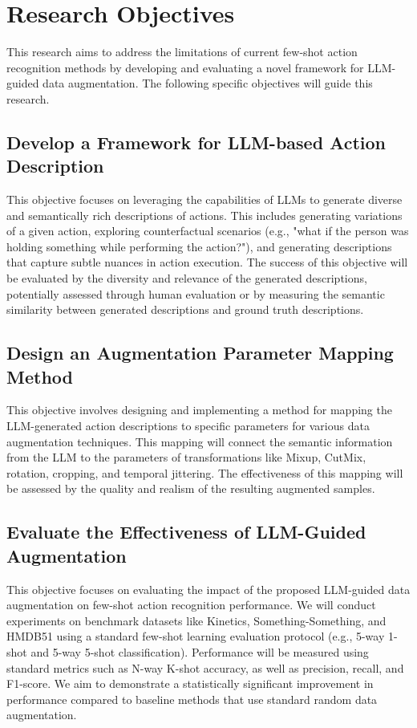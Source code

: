 \section{Research Objectives}

This research aims to address the limitations of current few-shot action recognition methods by developing and evaluating a novel framework for LLM-guided data augmentation. The following specific objectives will guide this research.


\subsection{Develop a Framework for LLM-based Action Description } %

This objective focuses on leveraging the capabilities of LLMs to generate diverse and semantically rich descriptions of actions. This includes generating variations of a given action, exploring counterfactual scenarios (e.g., "what if the person was holding something while performing the action?"), and generating descriptions that capture subtle nuances in action execution. The success of this objective will be evaluated by the diversity and relevance of the generated descriptions, potentially assessed through human evaluation or by measuring the semantic similarity between generated descriptions and ground truth descriptions.

\subsection{Design an Augmentation Parameter Mapping Method} 
This objective involves designing and implementing a method for mapping the LLM-generated action descriptions to specific parameters for various data augmentation techniques. This mapping will connect the semantic information from the LLM to the parameters of transformations like Mixup, CutMix, rotation, cropping, and temporal jittering. The effectiveness of this mapping will be assessed by the quality and realism of the resulting augmented samples.

\subsection{Evaluate the Effectiveness of LLM-Guided Augmentation} 

This objective focuses on evaluating the impact of the proposed LLM-guided data augmentation on few-shot action recognition performance. We will conduct experiments on benchmark datasets like Kinetics, Something-Something\cite{goyal2017something}, and HMDB51 \cite{kuehne2011hmdb} using a standard few-shot learning evaluation protocol (e.g., 5-way 1-shot and 5-way 5-shot classification). Performance will be measured using standard metrics such as N-way K-shot accuracy, as well as precision, recall, and F1-score. We aim to demonstrate a statistically significant improvement in performance compared to baseline methods that use standard random data augmentation.

